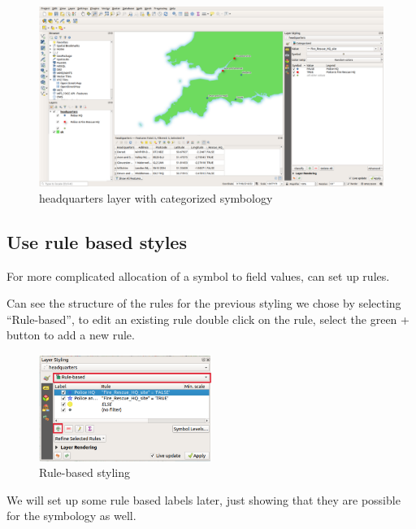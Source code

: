\begin{figure}[!h]
	\centering
	\includegraphics[width=1\textwidth]{images/headquarters_styled.png}
	\caption{headquarters layer with categorized symbology}
	\label{ft_fig_firstfig3}
\end{figure}
\newpage
\subsection{Use rule based styles}

For more complicated allocation of a symbol to field values, can set up rules.

Can see the structure of the rules for the previous styling we chose by selecting “Rule-based”, to edit an existing rule double click on the rule, select the green + button to add a new rule.\\


\begin{figure}[!h]
	\centering
	\includegraphics[width=0.5\textwidth]{images/headquarter_rule_based_styles1.png}
	\caption{Rule-based styling}
	\label{ft_fig_firstfig3}
\end{figure}

%

We will set up some rule based labels later, just showing that they are possible for the symbology as well.\\
